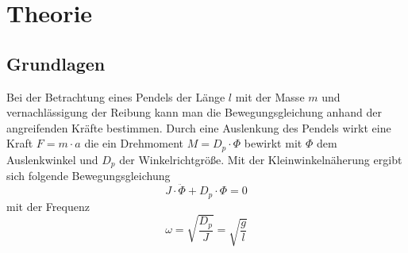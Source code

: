 \section{Theorie}
\label{sec:theorie}
\subsection{Grundlagen}
Bei der Betrachtung eines Pendels der Länge $l$ mit der Masse $m$ und vernachlässigung der Reibung kann man die Bewegungsgleichung anhand der angreifenden Kräfte bestimmen.
Durch eine Auslenkung des Pendels wirkt eine Kraft $F = m\cdot a$ die ein Drehmoment    $ M = D_p \cdot \Phi$
bewirkt mit $\Phi$ dem Auslenkwinkel und $D_p$ der Winkelrichtgröße.
Mit der Kleinwinkelnäherung ergibt sich folgende Bewegungsgleichung 
\begin{equation}
    J\cdot \ddot{\Phi} + D_p \cdot \Phi = 0
\end{equation}
mit der Frequenz 
\begin{equation}
    \omega = \sqrt{\frac{D_p}{J}}=\sqrt{\frac{g}{l}}
\end{equation}
